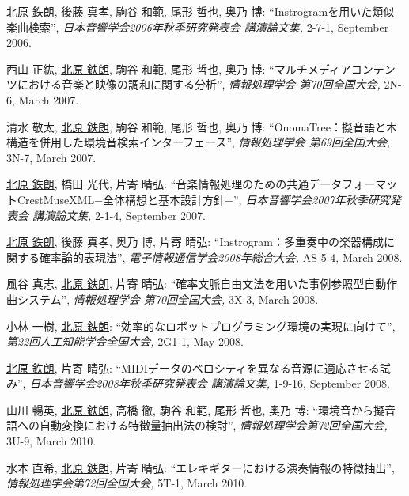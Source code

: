 \begin{Enumerate}
\item 
\underline{北原 鉄朗}, 
後藤
      真孝, 
駒谷
      和範, 
尾形 哲也, 
奥乃 博: 
    ``Instrogramを用いた類似楽曲検索'', 
    {\it 日本音響学会2006年秋季研究発表会 講演論文集,} 2-7-1, September 2006. 

\item 
西山 正紘, 
\underline{北原 鉄朗}, 
駒谷
      和範, 
尾形 哲也, 
奥乃 博: 
    ``マルチメディアコンテンツにおける音楽と映像の調和に関する分析'', 
    {\it 情報処理学会 第70回全国大会,} 2N-6, March 2007. 

\item 
清水 敬太, 
\underline{北原 鉄朗}, 
駒谷
      和範, 
尾形 哲也, 
奥乃 博: 
    ``OnomaTree：擬音語と木構造を併用した環境音検索インターフェース'', 
    {\it 情報処理学会 第69回全国大会,} 3N-7, March 2007. 

\item 
\underline{北原 鉄朗}, 
橋田 光代, 
片寄 晴弘: 
    ``音楽情報処理のための共通データフォーマットCrestMuseXML−全体構想と基本設計方針−'', 
    {\it 日本音響学会2007年秋季研究発表会 講演論文集,} 2-1-4, September 2007. 

\item 
\underline{北原 鉄朗}, 
後藤
      真孝, 
奥乃 博, 
片寄 晴弘: 
    ``Instrogram：多重奏中の楽器構成に関する確率論的表現法'', 
    {\it 電子情報通信学会2008年総合大会,
    } AS-5-4, March 2008. 

\item 
風谷 真志, 
\underline{北原 鉄朗}, 
片寄 晴弘: 
    ``確率文脈自由文法を用いた事例参照型自動作曲システム'', 
    {\it 情報処理学会 第70回全国大会,} 3X-3, March 2008. 

\item 
小林 一樹, 
\underline{北原 鉄朗}: 
    ``効率的なロボットプログラミング環境の実現に向けて'', 
    {\it 第22回人工知能学会全国大会,} 2G1-1, May 2008. 

\item 
\underline{北原 鉄朗}, 
片寄 晴弘: 
    ``MIDIデータのベロシティを異なる音源に適応させる試み'', 
    {\it 日本音響学会2008年秋季研究発表会 講演論文集,} 1-9-16, September 2008. 

\item 
山川 暢英, 
\underline{北原 鉄朗}, 
高橋 徹, 
駒谷 和範, 
尾形 哲也, 
奥乃 博: 
    ``環境音から擬音語への自動変換における特徴量抽出法の検討'', 
    {\it 情報処理学会第72回全国大会,
    } 3U-9, March 2010. 

\item 
水本 直希, 
\underline{北原 鉄朗}, 
片寄 晴弘: 
    ``エレキギターにおける演奏情報の特徴抽出'', 
    {\it 情報処理学会第72回全国大会,
    } 5T-1, March 2010. 


\end{Enumerate}

